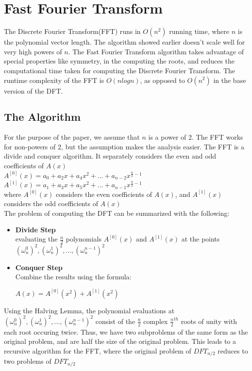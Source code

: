 \documentclass{article}
\begin{document}
\section{Fast Fourier Transform} \cite{fft}
The Discrete Fourier Transform(FFT) runs in $O(n^{2})$ running time, where $n$ is the polynomial vector length. The algorithm showed earlier doesn't scale well for very high powers of $n$. The Fast Fourier Transform algorithm takes advantage of special properties like symmetry, in the computing the roots, and reduces the computational time taken for computing the Discrete Fourier Transform. The runtime complexity of the FFT is $O(nlog{n})$, as opposed to $O(n^{2})$ in the base version of the DFT. \\

\subsection{The Algorithm}
For the purpose of the paper, we assume that $n$ is a power of 2. The FFT works for non-powers of 2, but the assumption makes the analysis easier. The FFT is a divide and conquer algorithm. It separately considers the even and odd coefficients of $A(x)$ \\

$A^{[0]}(x)=a_{0}+a_{2}x+a_{4}x^{2}+...+a_{n-2}x^{\frac{n}{2}-1}$ \\
$A^{[1]}(x)=a_{1}+a_{3}x+a_{5}x^{2}+...+a_{n-1}x^{\frac{n}{2}-1}$ \\

where $A^{[0]}(x)$ considers the even coefficients of $A(x)$, and $A^{[1]}(x)$ considers the odd coefficients of $A(x)$ \\
The problem of computing the DFT can be summarized with the following: \\
\begin{itemize}
\item
\textbf{Divide Step} \\
evaluating the $\frac{n}{2}$ polynomials $A^{[0]}(x)$ and $A^{[1]}(x)$ at the points $(\omega_{n}^{0})^{2},(\omega_{n}^{1})^{2},...,(\omega_{n}^{n-1})^{2}$
\item
\textbf{Conquer Step} \\
Combine the results using the formula: \\
\begin{center}
$A(x)=A^{[0]}(x^{2})+A^{[1]}(x^{2})$
\end{center}
\end{itemize}
Using the Halving Lemma, the polynomial evaluations at $(\omega_{n}^{0})^{2},(\omega_{n}^{1})^{2},...,(\omega_{n}^{n-1})^{2}$ consist of the $\frac{n}{2}$ complex $\frac{n}{2}^{th}$ roots of unity with each root occuring twice. Thus, we have two subproblems of the same form as the original problem, and are half the size of the original problem. This leads to a recursive algorithm for the FFT, where the original problem of $DFT_{n/2}$ reduces to two problems of $DFT_{n/2}$
\end{document}
